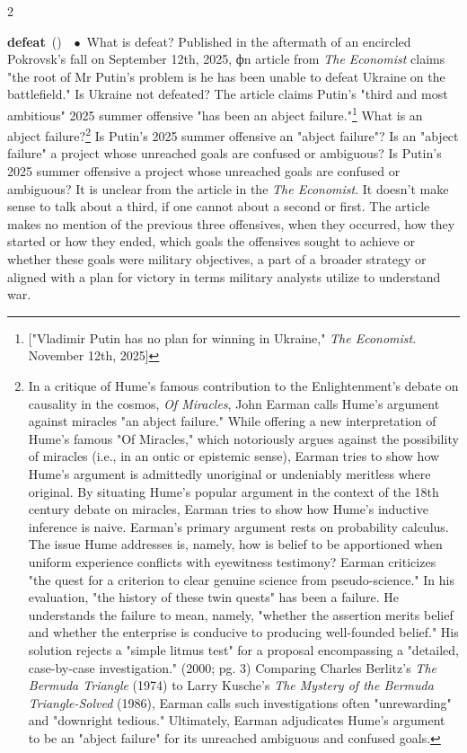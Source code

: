 \documentclass[10pt,a4paper,twoside]{article} %
\newcommand{\entry}[4]{\markboth{#1}{#1}\textbf{#1}\ {(#2)}\ \textit{#3}\ $\bullet$\ {#4}}  %
\begin{document}
\begin{multicols}{2}
\entry{defeat} {} {} {What is defeat? Published in the aftermath of an encircled Pokrovsk's fall on  September 12th, 2025, фn article from \emph{The Economist} claims "the root of Mr Putin’s problem is he has been unable to defeat Ukraine on the battlefield." Is Ukraine not defeated? The article claims Putin's "third and most ambitious" 2025 summer offensive "has been an abject failure."\footnote{["Vladimir Putin has no plan for winning in Ukraine," \emph{The Economist}. November 12th, 2025]} What is an abject failure?\footnote{In a critique of Hume's famous contribution to the Enlightenment's debate on causality in the cosmos, \emph{Of Miracles}, John Earman calls Hume's argument against miracles "an abject failure." While offering a new interpretation of Hume's famous "Of Miracles," which notoriously argues against the possibility of miracles (i.e., in an ontic or epistemic sense), Earman tries to show how Hume's argument is admittedly unoriginal or undeniably meritless where original. By situating Hume's popular argument in the context of the 18th century debate on miracles, Earman tries to show how Hume's inductive inference is naive. Earman's primary argument rests on probability calculus. The issue Hume addresses is, namely, how is belief to be apportioned when uniform experience conflicts with eyewitness testimony? Earman criticizes "the quest for a criterion to clear genuine science from pseudo-science." In his evaluation, "the history of these twin quests" has been a failure. He understands the failure to mean, namely, "whether the assertion merits belief and whether the enterprise is conducive to producing well-founded belief." His solution rejects a "simple litmus test" for a proposal encompassing a "detailed, case-by-case investigation." (2000; pg. 3) Comparing Charles Berlitz's \emph{The Bermuda Triangle} (1974) to Larry Kusche's \emph{The Mystery of the Bermuda Triangle-Solved} (1986),  Earman calls such investigations often "unrewarding" and "downright tedious." Ultimately, Earman adjudicates Hume's argument to be an "abject failure" for its unreached ambiguous and confused goals.} Is Putin's 2025 summer offensive an "abject failure"? Is an "abject failure" a project whose unreached goals are confused or ambiguous? Is Putin's 2025 summer offensive a project whose unreached goals are confused or ambiguous? \newline \indent It is unclear from the article in the \emph{The Economist}. It doesn't make sense to talk about a third, if one cannot about a second or first. The article makes no mention of the previous three offensives, when they occurred, how they started or how they ended, which goals the offensives sought to achieve or whether these goals were military objectives, a part of a broader strategy or aligned with a plan for victory in terms military analysts utilize to understand war. 
}


\end{multicols}
\end{document}
